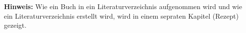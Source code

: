 
\textbf{Hinweis:} Wie ein Buch in ein Literaturverzeichnis aufgenommen wird und wie ein Literaturverzeichnis erstellt wird, wird in einem sepraten Kapitel (Rezept) gezeigt.
